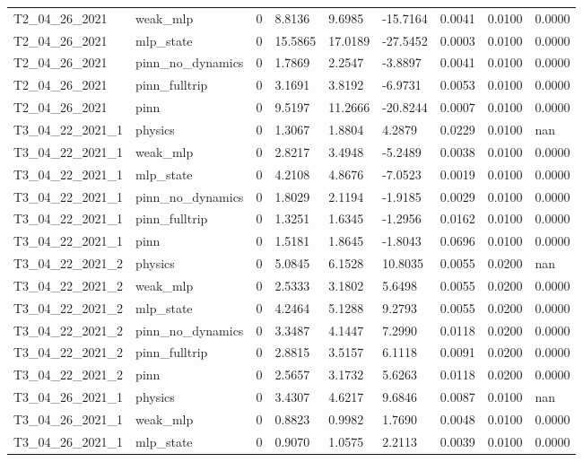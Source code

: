 \begin{table}[t]
\begin{tabular}{lllllllll}
T2\_04\_26\_2021 & weak\_mlp & 0 & 8.8136 & 9.6985 & -15.7164 & 0.0041 & 0.0100 & 0.0000 \\
T2\_04\_26\_2021 & mlp\_state & 0 & 15.5865 & 17.0189 & -27.5452 & 0.0003 & 0.0100 & 0.0000 \\
T2\_04\_26\_2021 & pinn\_no\_dynamics & 0 & 1.7869 & 2.2547 & -3.8897 & 0.0041 & 0.0100 & 0.0000 \\
T2\_04\_26\_2021 & pinn\_fulltrip & 0 & 3.1691 & 3.8192 & -6.9731 & 0.0053 & 0.0100 & 0.0000 \\
T2\_04\_26\_2021 & pinn & 0 & 9.5197 & 11.2666 & -20.8244 & 0.0007 & 0.0100 & 0.0000 \\
T3\_04\_22\_2021\_1 & physics & 0 & 1.3067 & 1.8804 & 4.2879 & 0.0229 & 0.0100 & nan \\
T3\_04\_22\_2021\_1 & weak\_mlp & 0 & 2.8217 & 3.4948 & -5.2489 & 0.0038 & 0.0100 & 0.0000 \\
T3\_04\_22\_2021\_1 & mlp\_state & 0 & 4.2108 & 4.8676 & -7.0523 & 0.0019 & 0.0100 & 0.0000 \\
T3\_04\_22\_2021\_1 & pinn\_no\_dynamics & 0 & 1.8029 & 2.1194 & -1.9185 & 0.0029 & 0.0100 & 0.0000 \\
T3\_04\_22\_2021\_1 & pinn\_fulltrip & 0 & 1.3251 & 1.6345 & -1.2956 & 0.0162 & 0.0100 & 0.0000 \\
T3\_04\_22\_2021\_1 & pinn & 0 & 1.5181 & 1.8645 & -1.8043 & 0.0696 & 0.0100 & 0.0000 \\
T3\_04\_22\_2021\_2 & physics & 0 & 5.0845 & 6.1528 & 10.8035 & 0.0055 & 0.0200 & nan \\
T3\_04\_22\_2021\_2 & weak\_mlp & 0 & 2.5333 & 3.1802 & 5.6498 & 0.0055 & 0.0200 & 0.0000 \\
T3\_04\_22\_2021\_2 & mlp\_state & 0 & 4.2464 & 5.1288 & 9.2793 & 0.0055 & 0.0200 & 0.0000 \\
T3\_04\_22\_2021\_2 & pinn\_no\_dynamics & 0 & 3.3487 & 4.1447 & 7.2990 & 0.0118 & 0.0200 & 0.0000 \\
T3\_04\_22\_2021\_2 & pinn\_fulltrip & 0 & 2.8815 & 3.5157 & 6.1118 & 0.0091 & 0.0200 & 0.0000 \\
T3\_04\_22\_2021\_2 & pinn & 0 & 2.5657 & 3.1732 & 5.6263 & 0.0118 & 0.0200 & 0.0000 \\
T3\_04\_26\_2021\_1 & physics & 0 & 3.4307 & 4.6217 & 9.6846 & 0.0087 & 0.0100 & nan \\
T3\_04\_26\_2021\_1 & weak\_mlp & 0 & 0.8823 & 0.9982 & 1.7690 & 0.0048 & 0.0100 & 0.0000 \\
T3\_04\_26\_2021\_1 & mlp\_state & 0 & 0.9070 & 1.0575 & 2.2113 & 0.0039 & 0.0100 & 0.0000 \\

\end{tabular}
\end{table}
